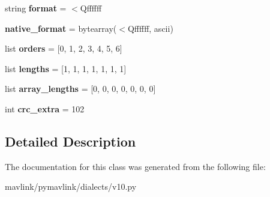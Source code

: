 \begin{DoxyCompactItemize}
\mbox{\label{classpymavlink_1_1dialects_1_1v10_1_1MAVLink__global__vision__position__estimate__message_a878b711a34c63df27a455ac38d4fae8e}} 
string {\bfseries format} = \textquotesingle{}$<$Qffffff\textquotesingle{}
\item 
\mbox{\label{classpymavlink_1_1dialects_1_1v10_1_1MAVLink__global__vision__position__estimate__message_ae74b3f5cec620bd3835852b4e620632f}} 
{\bfseries native\+\_\+format} = bytearray(\textquotesingle{}$<$Qffffff\textquotesingle{}, \textquotesingle{}ascii\textquotesingle{})
\item 
\mbox{\label{classpymavlink_1_1dialects_1_1v10_1_1MAVLink__global__vision__position__estimate__message_a91a183ccc3996cce0c1cba73567ca241}} 
list {\bfseries orders} = \mbox{[}0, 1, 2, 3, 4, 5, 6\mbox{]}
\item 
\mbox{\label{classpymavlink_1_1dialects_1_1v10_1_1MAVLink__global__vision__position__estimate__message_a5241e1ff852397d115eeacf5baac53d4}} 
list {\bfseries lengths} = \mbox{[}1, 1, 1, 1, 1, 1, 1\mbox{]}
\item 
\mbox{\label{classpymavlink_1_1dialects_1_1v10_1_1MAVLink__global__vision__position__estimate__message_a70678c72e1e02c7c26b6e585bfdcb924}} 
list {\bfseries array\+\_\+lengths} = \mbox{[}0, 0, 0, 0, 0, 0, 0\mbox{]}
\item 
\mbox{\label{classpymavlink_1_1dialects_1_1v10_1_1MAVLink__global__vision__position__estimate__message_ad5ea2529c165f5b952c5d1b93cc64e8c}} 
int {\bfseries crc\+\_\+extra} = 102
\end{DoxyCompactItemize}


\subsection{Detailed Description}
\begin{DoxyVerb}\end{DoxyVerb}
 

The documentation for this class was generated from the following file\+:\begin{DoxyCompactItemize}
\item 
mavlink/pymavlink/dialects/v10.\+py\end{DoxyCompactItemize}
